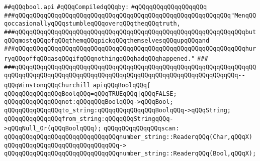 \label{src/lib/std/src/bool.api}
\verb|##qQQqbool.api|\newline
\newline
\verb|#qQQqCompiledqQQqby:|\newline
\verb|#qQQqqQQqqQQqqQQqqQQq|\newline
\newline
\newline
\newline
\verb|###qQQqqQQqqQQqqQQqqQQqqQQqqQQqqQQqqQQqqQQqqQQqqQQqqQQqqQQqqQQq"MenqQQqoccasionallyqQQqstumbleqQQqoverqQQqtheqQQqtruth,|\newline
\verb|###qQQqqQQqqQQqqQQqqQQqqQQqqQQqqQQqqQQqqQQqqQQqqQQqqQQqqQQqqQQqqQQqbutqQQqmostqQQqofqQQqthemqQQqpickqQQqthemselvesqQQqupqQQqand|\newline
\verb|###qQQqqQQqqQQqqQQqqQQqqQQqqQQqqQQqqQQqqQQqqQQqqQQqqQQqqQQqqQQqqQQqhurryqQQqoffqQQqasqQQqifqQQqnothingqQQqhadqQQqhappened."|\newline
\verb|###|\newline
\verb|###qQQqqQQqqQQqqQQqqQQqqQQqqQQqqQQqqQQqqQQqqQQqqQQqqQQqqQQqqQQqqQQqqQQqqQQqqQQqqQQqqQQqqQQqqQQqqQQqqQQqqQQqqQQqqQQqqQQqqQQqqQQqqQQqqQQq--qQQqWinstonqQQqChurchill|\newline
\newline
\newline
\newline
\verb|apiqQQqBoolqQQq{|\newline
\newline
\verb|qQQqqQQqqQQqqQQqBoolqQQq=qQQqTRUEqQQq|\verb#|qQQqFALSE;#\newline
\newline
\verb|qQQqqQQqqQQqqQQqnot:qQQqqQQqBoolqQQq->qQQqBool;|\newline
\newline
\verb|qQQqqQQqqQQqqQQqto_string:qQQqqQQqqQQqqQQqBoolqQQq->qQQqString;|\newline
\verb|qQQqqQQqqQQqqQQqfrom_string:qQQqqQQqStringqQQq->qQQqNull_Or(qQQqBoolqQQq);|\newline
\newline
\verb|qQQqqQQqqQQqqQQqscan:|\newline
\verb|qQQqqQQqqQQqqQQqqQQqqQQqqQQqqQQqnumber_string::ReaderqQQq(Char,qQQqX)|\newline
\verb|qQQqqQQqqQQqqQQqqQQqqQQqqQQqqQQq->|\newline
\verb|qQQqqQQqqQQqqQQqqQQqqQQqqQQqqQQqnumber_string::ReaderqQQq(Bool,qQQqX);|\newline
